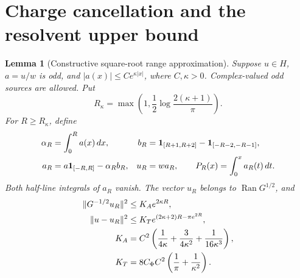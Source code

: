 \documentclass[11pt]{article}
\newtheorem{lemma}[theorem]{Lemma}
\theoremstyle{remark}
\newcommand{\dd}{\,d}
\newcommand{\Ran}{\operatorname{Ran}}
\begin{document}
\section{Charge cancellation and the resolvent upper bound}

\begin{lemma}[Constructive square-root range approximation]\label{charge}
Suppose \(u\in H\), \(a=u/w\) is odd, and
\(|a(x)|\le Ce^{\kappa|x|}\), where \(C,\kappa>0\).
Complex-valued odd sources are allowed.
Put
\[
 R_\kappa=\max\left(1,\frac12\log\frac{2(\kappa+1)}{\pi}\right).
\]
For \(R\ge R_\kappa\), define
\begin{align}
 \alpha_R&=\int_0^R a(x)\dd x,&
 b_R&=\mathbf1_{[R+1,R+2]}-\mathbf1_{[-R-2,-R-1]},\notag\\
 a_R&=a\mathbf1_{[-R,R]}-\alpha_R b_R,&
 u_R&=wa_R,\qquad P_R(x)=\int_0^x a_R(t)\dd t.\label{charges}
\end{align}
Both half-line integrals of \(a_R\) vanish. The vector \(u_R\)
belongs to \(\Ran G^{1/2}\), and
\begin{align}
 \|G^{-1/2}u_R\|^2&\le K_Ae^{2\kappa R},\label{rangebound}\\
 \|u-u_R\|^2&\le K_Te^{(2\kappa+2)R-\pi e^{2R}},\label{tailbound}\\
 K_A&=C^2\left(\frac1{4\kappa}+\frac3{4\kappa^2}
                                +\frac1{16\kappa^3}\right),\notag\\
 K_T&=8C_\Phi C^2\left(\frac1\pi+\frac1{\kappa^2}\right).\notag
\end{align}
\end{lemma}
\end{document}
